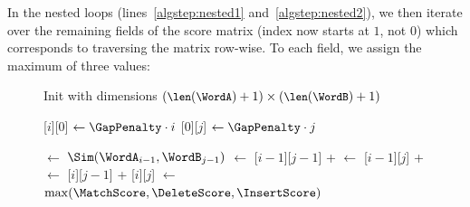 In the nested loops (lines~\ref{algstep:nested1} and~\ref{algstep:nested2}), we then iterate over the remaining fields of the score matrix (index now starts at $1$, not $0$) which corresponds to traversing the matrix row-wise. To each field, we assign the maximum of three values:

\begin{figure}

\begin{minipage}[t]{0.6\textwidth}

\begin{algorithm}[H]
    \DontPrintSemicolon
    
    \newcommand{\ScoreMatrixIdx}[2]{{\ScoreMatrix}[{#1}][{#2}]}

    \KwOut{\Score}
    \Fn{\calcScoreFunc{}}
    {
        \SetInd{0.25em}{0.55em}
        Init \ScoreMatrix with dimensions $\small{(\len(\WordA)+1) \times (\len(\WordB)+1)}$\;

        \BlankLine

        {
            \ScoreMatrixIdx{$i$}{$0$} $\gets \GapPenalty \cdot i$\;
        }
        {
            \ScoreMatrixIdx{$0$}{$j$} $\gets \GapPenalty \cdot j$
            \label{algstep:init-gap-end}\;
        }

        \BlankLine

        {
            {
                \Cost $\gets$ $\Sim(\WordA_{i-1}, \WordB_{j-1})$
                \label{algstep:sim}\;
                \MatchScore $\gets$ \ScoreMatrixIdx{$i-1$}{$j-1$} + \Cost
                \label{algstep:matchscore}\;
                \DeleteScore $\gets$ \ScoreMatrixIdx{$i-1$}{$j$} + \GapPenalty
                \label{algstep:deletescore}\;
                \InsertScore $\gets$ \ScoreMatrixIdx{$i$}{$j-1$} + \GapPenalty
                \label{algstep:insertscore}\;
                \ScoreMatrixIdx{$i$}{$j$} $\gets$
                $\max(\MatchScore, \DeleteScore, \InsertScore)$
                \label{algstep:max}\;
            }
        }

}
\end{algorithm}
\end{minipage}
\end{figure}
